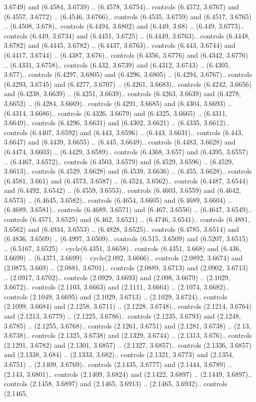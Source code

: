 3.6749) and (6.4584, 3.6739) .. (6.4578, 3.6754).. controls (6.4572, 3.6767) and (6.4557, 3.6772) .. (6.4546, 3.6766).. controls (6.4535, 3.6759) and (6.4517, 3.6765) .. (6.4508, 3.678).. controls (6.4494, 3.6802) and (6.449, 3.68) .. (6.449, 3.6773).. controls (6.449, 3.6734) and (6.4451, 3.6725) .. (6.4449, 3.6763).. controls (6.4448, 3.6782) and (6.4445, 3.6782) .. (6.4437, 3.6763).. controls (6.443, 3.6744) and (6.4417, 3.6744) .. (6.4387, 3.676).. controls (6.4356, 3.6776) and (6.4342, 3.6776) .. (6.4331, 3.6758).. controls (6.432, 3.6739) and (6.4312, 3.6743) .. (6.4305, 3.677).. controls (6.4297, 3.6805) and (6.4296, 3.6805) .. (6.4294, 3.6767).. controls (6.4293, 3.6745) and (6.4277, 3.6707) .. (6.4261, 3.6683).. controls (6.4242, 3.6656) and (6.4238, 3.6639) .. (6.4251, 3.6639).. controls (6.4263, 3.6639) and (6.4278, 3.6652) .. (6.4284, 3.6669).. controls (6.4291, 3.6685) and (6.4304, 3.6693) .. (6.4314, 3.6686).. controls (6.4326, 3.6679) and (6.4325, 3.6665) .. (6.4311, 3.6649).. controls (6.4296, 3.6631) and (6.4302, 3.6621) .. (6.4335, 3.6612).. controls (6.4407, 3.6592) and (6.443, 3.6596) .. (6.443, 3.6631).. controls (6.443, 3.6647) and (6.4439, 3.6655) .. (6.445, 3.6649).. controls (6.4483, 3.6628) and (6.4474, 3.6603) .. (6.4429, 3.6589).. controls (6.4368, 3.657) and (6.4395, 3.6557) .. (6.4467, 3.6572).. controls (6.4503, 3.6579) and (6.4529, 3.6596) .. (6.4529, 3.6613).. controls (6.4529, 3.6628) and (6.4539, 3.6636) .. (6.455, 3.6628).. controls (6.4581, 3.661) and (6.4573, 3.6587) .. (6.4524, 3.6562).. controls (6.4487, 3.6544) and (6.4492, 3.6542) .. (6.4559, 3.6553).. controls (6.4603, 3.6559) and (6.4642, 3.6573) .. (6.4645, 3.6582).. controls (6.4654, 3.6605) and (6.4689, 3.6604) .. (6.4689, 3.6581).. controls (6.4689, 3.6571) and (6.467, 3.6556) .. (6.4647, 3.6549).. controls (6.4571, 3.6525) and (6.462, 3.6521) .. (6.4746, 3.6541).. controls (6.4881, 3.6562) and (6.4934, 3.6553) .. (6.4828, 3.6525).. controls (6.4785, 3.6514) and (6.4836, 3.6509) .. (6.4997, 3.6509).. controls (6.515, 3.6509) and (6.5207, 3.6515) .. (6.5167, 3.6525) -- cycle(6.4351, 3.6658).. controls (6.4351, 3.668) and (6.436, 3.6699) .. (6.4371, 3.6699) -- cycle(2.092, 3.6666).. controls (2.0892, 3.6674) and (2.0875, 3.669) .. (2.0881, 3.6701).. controls (2.0889, 3.6713) and (2.0902, 3.6713) .. (2.0917, 3.6702).. controls (2.0929, 3.6693) and (2.098, 3.6679) .. (2.1029, 3.6672).. controls (2.1103, 3.6663) and (2.1111, 3.6664) .. (2.1074, 3.6682).. controls (2.1049, 3.6695) and (2.1029, 3.6713) .. (2.1029, 3.6724).. controls (2.1099, 3.6684) and (2.1258, 3.6711) .. (2.1228, 3.6748).. controls (2.1214, 3.6764) and (2.1213, 3.6779) .. (2.1225, 3.6786).. controls (2.1235, 3.6793) and (2.1248, 3.6785) .. (2.1255, 3.6768).. controls (2.1261, 3.6751) and (2.1281, 3.6738) .. (2.13, 3.6738).. controls (2.1325, 3.6738) and (2.1329, 3.6744) .. (2.1313, 3.676).. controls (2.1291, 3.6782) and (2.1301, 3.6857) .. (2.1327, 3.6857).. controls (2.1336, 3.6857) and (2.1338, 3.684) .. (2.1333, 3.682).. controls (2.1321, 3.6773) and (2.1354, 3.6751) .. (2.1409, 3.6769).. controls (2.1435, 3.6777) and (2.1444, 3.6789) .. (2.143, 3.6801).. controls (2.1409, 3.6824) and (2.1422, 3.6897) .. (2.1449, 3.6897).. controls (2.1458, 3.6897) and (2.1465, 3.6913) .. (2.1465, 3.6932).. controls (2.1465, 